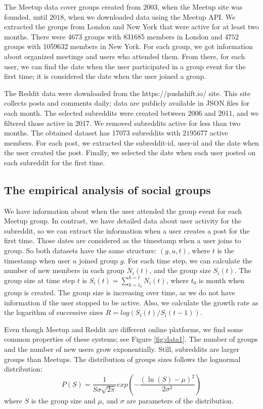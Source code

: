 The Meetup data cover groups created from $2003$, when the Meetup site was founded, until $2018$, when we downloaded data using the Meetup API. We extracted the groups from London and New York that were active for at least two months. There were 4673 groups with 831685 members in London and $4752$ groups with 1059632 members in New York. For each group, we got information about organized meetings and users who attended them. From there, for each user, we can find the date when the user participated in a group event for the first time; it is considered the date when the user joined a group. 

The Reddit data were downloaded from the https://pushshift.io/ site. This site collects posts and comments daily; data are publicly available in JSON files for each month. The selected subreddits were created between 2006 and 2011, and we filtered those active in 2017. We removed subreddits active for less than two months. The obtained dataset has 17073 subreddits with $2 195 677$ active members. For each post, we extracted the subreddit-id, user-id and the date when the user created the post. Finally, we selected the date when each user posted on each subreddit for the first time. 

\subsection{The empirical analysis of social groups}

We have information about when the user attended the group event for each Meetup group. In contrast, we have detailed data about user activity for the subreddit, so we can extract the information when a user creates a post for the first time. Those dates are considered as the timestamp when a user joins to group. So both datasets have the same structure: $(g, u, t)$, where $t$ is the timestamp when user $u$ joined group $g$. For each time step, we can calculate the number of new members in each group $N_i(t)$, and the group size $S_{i}(t)$. The group size at time step $t$ is $S_{i}(t)=\sum^{k=t}_{k=t_{0}}N_{i}(t)$, where $t_0$ is month when group is created. The group size is increasing over time, as we do not have information if the user stopped to be active. Also, we calculate the growth rate as the logarithm of successive sizes $R = log(S_{i}(t)/S_{i}(t-1))$.

Even though Meetup and Reddit are different online platforms, we find some common properties of these systems; see Figure \ref{fig:data1}. The number of groups and the number of new users grow exponentially. Still, subreddits are larger groups than Meetups. The distribution of groups sizes follows the lognormal distribution:
\begin{equation}
P(S)=\frac{1}{S\sigma\sqrt{2\pi}}exp(-\frac{(\ln(S)-\mu)^{2}}{2\sigma^{2}})
\label{eq:log}
\end{equation}
where $S$ is the group size and $\mu$, and $\sigma$ are parameters of the distribution.

